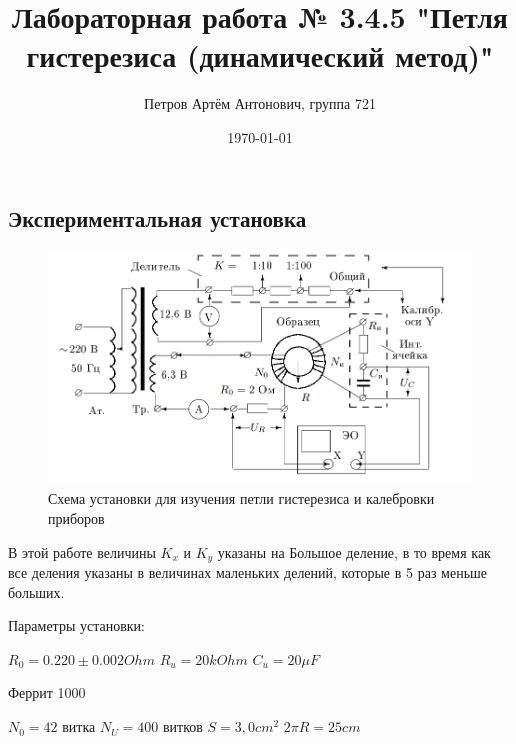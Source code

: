 \documentclass[a4paper,12pt]{article}
\author{Петров Артём Антонович, группа 721}
\title{Лабораторная работа № 3.4.5 "Петля гистерезиса (динамический метод)"}
\date{\today}
\begin{document}

\begin{minipage}[t][7cm]{\textwidth}
\maketitle
\end{minipage}

%
%
%
%

\bigskip

\subsection*{Экспериментальная установка}

\bigskip

\begin{figure}[ht]
\centering
\includegraphics[width=140mm]{scheme.png}
\caption{Схема установки для изучения петли гистерезиса и калебровки приборов}\label{schema}
\end{figure}

В этой работе величины $K_x$ и $K_y$ указаны на Большое деление, в то время как все деления указаны в величинах маленьких делений, которые в 5 раз меньше больших.

Параметры установки:

$R_0 = 0.220 \pm 0.002 Ohm$
$R_u = 20kOhm$
$C_u = 20 \mu F$
\medskip

Феррит 1000

$N_0 = 42$ витка
$N_U = 400 $ витков
$S = 3,0 cm^2$
$2\pi R = 25 cm$
\medskip
\end{document}
